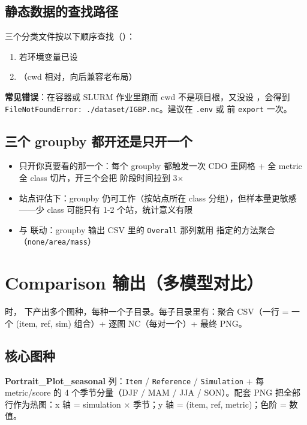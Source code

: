 \subsection{静态数据的查找路径}

三个分类文件按以下顺序查找（）：

\begin{enumerate}
  \item {} 若环境变量已设
  \item {}（cwd 相对，向后兼容老布局）
\end{enumerate}

\textbf{常见错误}：在容器或 SLURM 作业里跑而 cwd 不是项目根，又没设 ，会得到 \texttt{FileNotFoundError: ./dataset/IGBP.nc}。建议在 \texttt{.env} 或  前 \texttt{export} 一次。

\subsection{三个 groupby 都开还是只开一个}

\begin{itemize}
  \item 只开你真要看的那一个：每个 groupby 都触发一次 CDO 重网格 + 全 metric 全 class 切片，开三个会把  阶段时间拉到 3×
  \item 站点评估下：groupby 仍可工作（按站点所在 class 分组），但样本量更敏感——少 class 可能只有 1-2 个站，统计意义有限
  \item 与  联动：groupby 输出 CSV 里的 \texttt{Overall} 那列就用  指定的方法聚合（\texttt{none/area/mass}）
\end{itemize}

\section{Comparison 输出（多模型对比）}

 时， 下产出多个图种，每种一个子目录。每子目录里有：聚合 CSV（一行 = 一个 (item, ref, sim) 组合）+ 逐图 NC（每对一个）+ 最终 PNG。

\subsection{核心图种}

\textbf{Portrait\_Plot\_seasonal}  列：\texttt{Item} / \texttt{Reference} / \texttt{Simulation} + 每 metric/score 的 4 个季节分量（DJF / MAM / JJA / SON）。配套 PNG 把全部行作为热图：x 轴 = simulation × 季节；y 轴 = (item, ref, metric)；色阶 = 数值。

